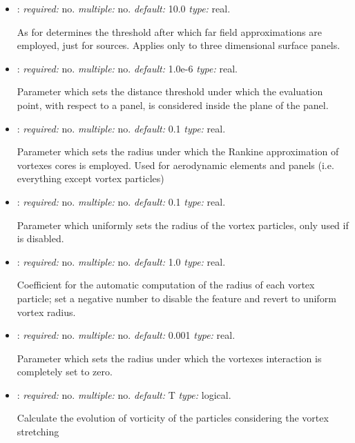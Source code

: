 \begin{itemize}
\item {}: \textit{required:} no. \textit{multiple:} no. \textit{default:} 10.0 \textit{type:} real.

As for  determines the threshold after which far field approximations are employed, just for sources. Applies only to three dimensional surface panels. 

\item {}: \textit{required:} no. \textit{multiple:} no. \textit{default:} 1.0e-6 \textit{type:} real.

Parameter which sets the distance threshold under which the evaluation point, with respect to a panel, is considered inside the plane of the panel.

\item {}: \textit{required:} no. \textit{multiple:} no. \textit{default:} 0.1 \textit{type:} real.

Parameter which sets the radius under which the Rankine approximation of vortexes cores is employed. Used for aerodynamic elements and panels (i.e. everything except vortex particles)

\item {}: \textit{required:} no. \textit{multiple:} no. \textit{default:} 0.1 \textit{type:} real.

Parameter which uniformly sets the radius of the vortex particles, only used if  is disabled.

\item {}: \textit{required:} no. \textit{multiple:} no. \textit{default:} 1.0 \textit{type:} real.

Coefficient for the automatic computation of the radius of each vortex particle; set a negative number to disable the feature and revert to uniform vortex radius. 

\item {}: \textit{required:} no. \textit{multiple:} no. \textit{default:} 0.001 \textit{type:} real. 

Parameter which sets the radius under which the vortexes interaction is completely set to zero.

\item {}: \textit{required:} no. \textit{multiple:} no. \textit{default:} T \textit{type:} logical.

Calculate the evolution of vorticity of the particles considering the vortex stretching


\end{itemize}
